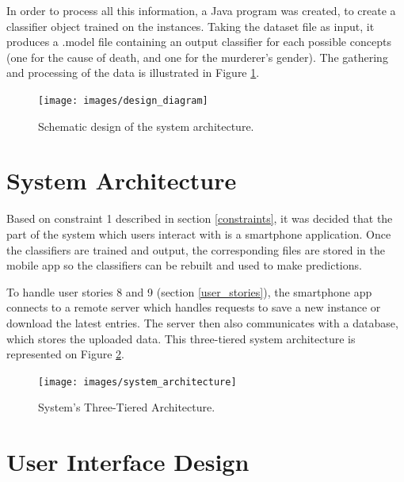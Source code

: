 \documentclass{mproj}
\begin{document}
In order to process all this information, a Java program was created, to create a classifier object trained on the instances. Taking the dataset file as input, it produces a .model file containing an output classifier for each possible concepts (one for the cause of death, and one for the murderer's gender). The gathering and processing of the data is illustrated in Figure \ref{fig:design}.

\begin{figure}[h]
	\centering
	\texttt{[image: images/design\_diagram]}
	\caption{Schematic design of the system architecture.}
	\label{fig:design}
\end{figure}

\section{System Architecture}

Based on constraint 1 described in section \ref{constraints}, it was decided that the part of the system which users interact with is a smartphone application. Once the classifiers are trained and output, the corresponding files are stored in the mobile app so the classifiers can be rebuilt and used to make predictions.\par

To handle user stories 8 and 9 (section \ref{user_stories}), the smartphone app connects to a remote server which handles requests to save a new instance or download the latest entries. The server then also communicates with a database, which stores the uploaded data. This three-tiered system architecture is represented on Figure \ref{fig:architecture}.

\begin{figure}[h]
	\centering
	\texttt{[image: images/system\_architecture]}
	\caption{System's Three-Tiered Architecture.}
	\label{fig:architecture}
\end{figure}

\section{User Interface Design}\label{wireframes}
\end{document}
